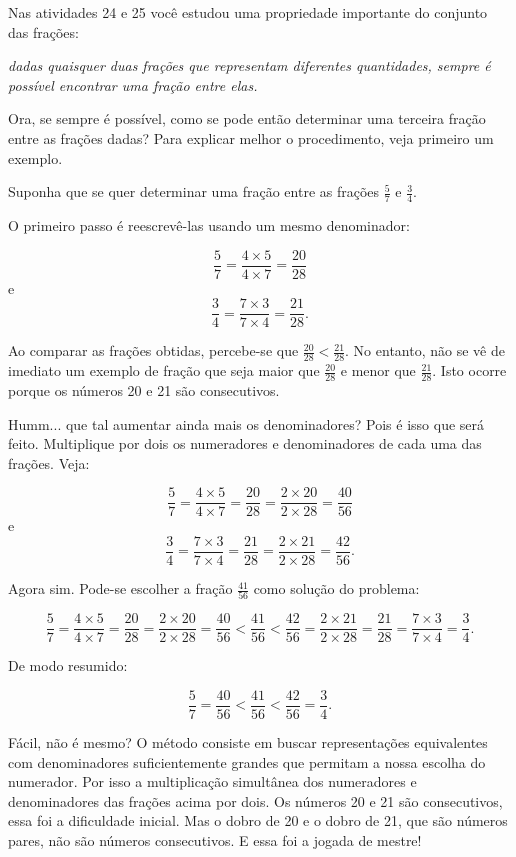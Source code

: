 \begin{refletindo*}[breakable]{}{}

  Nas atividades 24 e 25 você estudou uma propriedade importante do conjunto das frações:

{\it  dadas quaisquer duas frações que representam diferentes quantidades, sempre é possível encontrar uma  fração entre elas.}


  Ora, se sempre é possível, como se pode então determinar uma terceira fração entre as frações dadas? Para explicar melhor o procedimento, veja primeiro um exemplo.

  Suponha que se quer determinar uma fração entre as frações   $\frac{5}{7}$ e   $\frac{3}{4}$.

  O primeiro passo é reescrevê-las usando um mesmo denominador:

  $$\dfrac{5}{7} = \dfrac{4 \times 5}{ 4 \times 7} = \dfrac{20}{28}$$
  e
  $$\dfrac{3}{4} = \dfrac{7 \times 3}{ 7 \times 4} = \dfrac{21}{28}.$$

  Ao comparar as frações obtidas, percebe-se que   $\frac{20}{28}<\frac{21}{28}$. No entanto, não se vê de imediato um exemplo de fração que seja maior que   $\frac{20}{28}$ e menor que   $\frac{21}{28}$. Isto ocorre porque os números 20 e 21 são consecutivos.

  Humm... que tal aumentar ainda mais os denominadores? Pois é isso que será feito.  Multiplique por dois os numeradores e denominadores de cada uma das frações. Veja:

  $$\dfrac{5}{7} = \dfrac{4 \times 5}{ 4 \times 7} = \dfrac{20}{28} = \dfrac{2 \times 20}{ 2 \times 28} = \dfrac{40}{56}$$
  e
  $$\dfrac{3}{4} = \dfrac{7 \times 3}{ 7 \times 4} = \dfrac{21}{28} = \dfrac{2 \times 21}{2 \times 28} = \dfrac{42}{56}.$$

  Agora sim. Pode-se escolher a fração   $\frac{41}{56}$ como solução do problema:

  $$\dfrac{5}{7} = \dfrac{4 \times 5}{ 4 \times 7} = \dfrac{20}{28} = \dfrac{2 \times 20}{ 2 \times 28} = \dfrac{40}{56} < \dfrac{41}{56} < \dfrac{42}{56} = \dfrac{2 \times 21}{2 \times 28} =  \dfrac{21}{28} = \dfrac{7 \times 3}{ 7 \times 4} = \dfrac{3}{4}.$$

  De modo resumido:

  $$\dfrac{5}{7} = \dfrac{40}{56} < \dfrac{41}{56} < \dfrac{42}{56} =\dfrac{3}{4}.$$

  Fácil, não é mesmo? O método consiste em buscar representações equivalentes com denominadores suficientemente grandes que permitam a nossa escolha do numerador. Por isso a multiplicação simultânea dos numeradores e denominadores das frações acima por dois. Os números 20 e 21 são consecutivos, essa foi a dificuldade inicial. Mas o dobro de 20 e o dobro de 21, que são números pares, não são números consecutivos. E essa foi a jogada de mestre!


\end{refletindo*}

